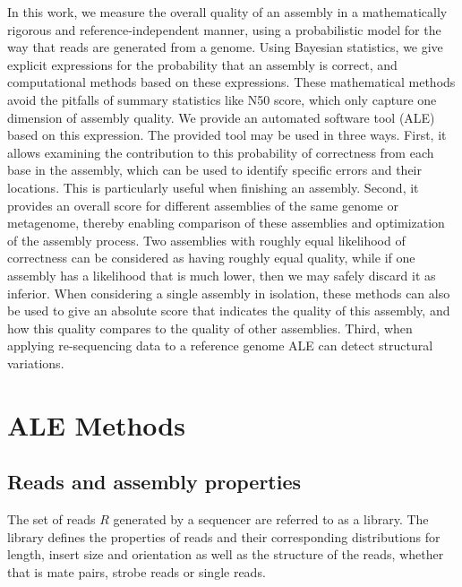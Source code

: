 \documentclass[phd,tocprelim]{cornell}
\begin{document}
In this work, we measure the overall quality of an assembly in a mathematically rigorous and reference-independent manner, using a probabilistic model for the way that reads are generated from a genome.  Using Bayesian statistics, we give explicit expressions for the probability that an assembly is correct, and computational methods based on these expressions.  These mathematical methods avoid the pitfalls of summary statistics like N50 score, which only capture one dimension of assembly quality. We provide an automated software tool (ALE) based on this expression.  The provided tool may be used in three ways.  First, it allows examining the contribution to this probability of correctness from each base in the assembly, which can be used to identify specific errors and their locations.  This is particularly useful when finishing an assembly.  Second, it provides an overall score for different assemblies of the same genome or metagenome, thereby enabling comparison of these assemblies and optimization of the assembly process.  Two assemblies with roughly equal likelihood of correctness can be considered as having roughly equal quality, while if one assembly has a likelihood that is much lower, then we may safely discard it as inferior.  When considering a single assembly in isolation, these methods can also be used to give an absolute score that indicates the quality of this assembly, and how this quality compares to the quality of other assemblies.  Third, when applying re-sequencing data to a reference genome ALE can detect structural variations.


\chapter{ALE Methods} %
\label{cha:ALE Methods}

\section{Reads and assembly properties}

The set of reads $R$ generated by a sequencer are referred to as a library. The library defines the properties of reads and their corresponding distributions for length, insert size and orientation as well as the structure of the reads, whether that is mate pairs, strobe reads or single reads.
\end{document}
